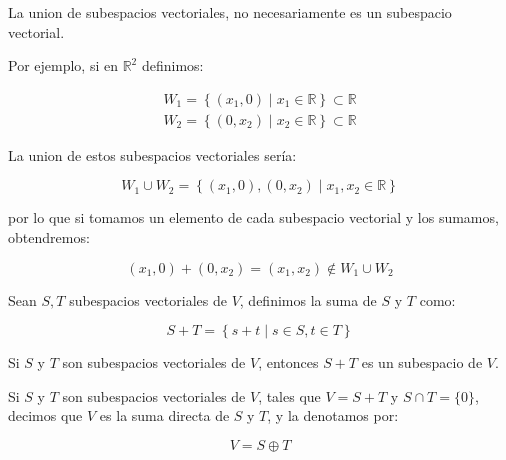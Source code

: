 		\begin{observacion}
			La union de subespacios vectoriales, no necesariamente es un subespacio vectorial.

			Por ejemplo, si en $\mathbb{R}^2$ definimos:

			\begin{eqnarray*}
				W_1 = \left\{ (x_1, 0) \mid x_1 \in \mathbb{R} \right\} \subset \mathbb{R} \\
				W_2 = \left\{ (0, x_2) \mid x_2 \in \mathbb{R} \right\} \subset \mathbb{R}
			\end{eqnarray*}

			La union de estos subespacios vectoriales sería:

			\begin{equation*}
				W_1 \cup W_2 = \left\{ (x_1, 0), (0, x_2) \mid x_1, x_2 \in \mathbb{R} \right\}
			\end{equation*}

			por lo que si tomamos un elemento de cada subespacio vectorial y los sumamos, obtendremos:

			\begin{equation*}
				(x_1, 0) + (0, x_2) = (x_1, x_2) \notin W_1 \cup W_2
			\end{equation*}
		\end{observacion}

		\begin{definicion}
			Sean $S, T$ subespacios vectoriales de $V$, definimos la suma de $S$ y $T$ como:

			\begin{equation}
				S + T = \left\{ s + t \mid s \in S, t \in T \right\}
			\end{equation}
		\end{definicion}

		\begin{proposicion}
			Si $S$ y $T$ son subespacios vectoriales de $V$, entonces $S + T$ es un subespacio de $V$.
		\end{proposicion}

		\begin{definicion}
			Si $S$ y $T$ son subespacios vectoriales de $V$, tales que $V = S + T$ y $S \cap T = \{0\}$, decimos que $V$ es la suma directa de $S$ y $T$, y la denotamos por:

			\begin{equation}
				V = S \oplus T 
			\end{equation}
		\end{definicion}

